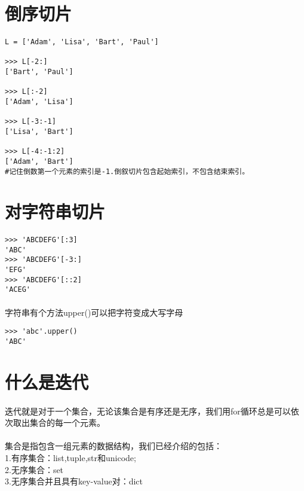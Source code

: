 \documentclass{article}
\begin{document}
\begin{CJK}{UTF8}{gbsn}
\section{倒序切片}
\paragraph{}
\begin{verbatim}
L = ['Adam', 'Lisa', 'Bart', 'Paul']

>>> L[-2:]
['Bart', 'Paul']

>>> L[:-2]
['Adam', 'Lisa']

>>> L[-3:-1]
['Lisa', 'Bart']

>>> L[-4:-1:2]
['Adam', 'Bart']
#记住倒数第一个元素的索引是-1.倒叙切片包含起始索引，不包含结束索引。
\end{verbatim}
\section{对字符串切片}
\paragraph{}
\begin{verbatim}
>>> 'ABCDEFG'[:3]
'ABC'
>>> 'ABCDEFG'[-3:]
'EFG'
>>> 'ABCDEFG'[::2]
'ACEG'
\end{verbatim}
\paragraph{}
字符串有个方法upper()可以把字符变成大写字母
\begin{verbatim}
>>> 'abc'.upper()
'ABC'
\end{verbatim}
\section{什么是迭代}
\paragraph{}
迭代就是对于一个集合，无论该集合是有序还是无序，我们用for循环总是可以依次取出集合的每一个元素。
\paragraph{}
集合是指包含一组元素的数据结构，我们已经介绍的包括：
\\1.有序集合：list,tuple,str和unicode;
\\2.无序集合：set
\\3.无序集合并且具有key-value对：dict

\end{CJK}
\end{document}

